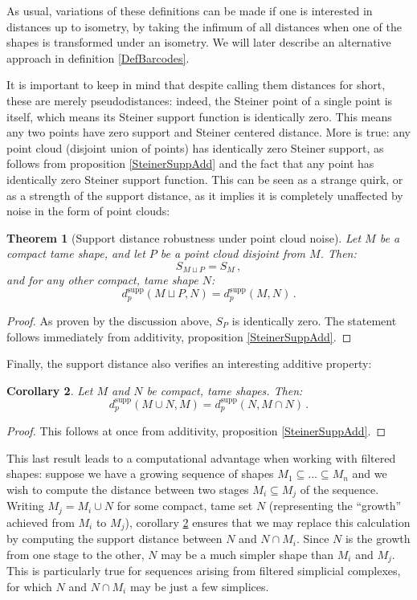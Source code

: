 \documentclass[a4paper]{article}
\newtheorem{theorem}{Theorem}[section]
\newtheorem{coro}[theorem]{Corollary}
\newcommand{\dsupp}{d^{\operatorname{supp}}}
\begin{document}
As usual, variations of these definitions can be made if one is interested in distances up to isometry, by taking the infimum of all distances when one of the shapes is transformed under an isometry. We will later describe an alternative approach in definition \ref{DefBarcodes}.

It is important to keep in mind that despite calling them distances for short, these are merely pseudodistances: indeed, the Steiner point of a single point is itself, which means its Steiner support function is identically zero. This means any two points have zero support and Steiner centered distance. More is true: any point cloud (disjoint union of points) has identically zero Steiner support, as follows from proposition \ref{SteinerSuppAdd} and the fact that any point has identically zero Steiner support function. This can be seen as a strange quirk, or as a strength of the support distance, as it implies it is completely unaffected by noise in the form of point clouds:

\begin{theorem}[Support distance robustness under point cloud noise]
	\label{ThmPointCloud}
	Let $M$ be a compact tame shape, and let $P$ be a point cloud disjoint from $M$. Then:
	\[ S_{M \sqcup P}=S_M\, , \]
	and for any other compact, tame shape $N$:
	\[\dsupp_p(M \sqcup P, N)=\dsupp_p(M,N)\, .\]
\end{theorem}

\begin{proof}
	As proven by the discussion above, $S_P$ is identically zero. The statement follows immediately from additivity, proposition \ref{SteinerSuppAdd}.
\end{proof}
Finally, the support distance also verifies an interesting additive property:
\begin{coro}
	\label{IterativeDist}
	Let $M$ and $N$ be compact, tame shapes. Then:
	\[ \dsupp_p(M\cup N, M)= \dsupp_p(N, M\cap N)\, .\]
\end{coro}

\begin{proof}
	This follows at once from additivity, proposition \ref{SteinerSuppAdd}.
\end{proof}

This last result leads to a computational advantage when working with filtered shapes: suppose we have a growing sequence of shapes $M_1 \subseteq ... \subseteq M_n$ and we wish to compute the distance between two stages $M_i \subseteq M_j$ of the sequence. Writing $M_j=M_i \cup N$ for some compact, tame set $N$ (representing the ``growth'' achieved from $M_i$ to $M_j$), corollary \ref{IterativeDist} ensures that we may replace this calculation by computing the support distance between $N$ and $N \cap M_i$. Since $N$ is the growth from one stage to the other, $N$ may be a much simpler shape than $M_i$ and $M_j$. This is particularly true for sequences arising from filtered simplicial complexes, for which $N$ and $N \cap M_i$ may be just a few simplices.
\end{document}
